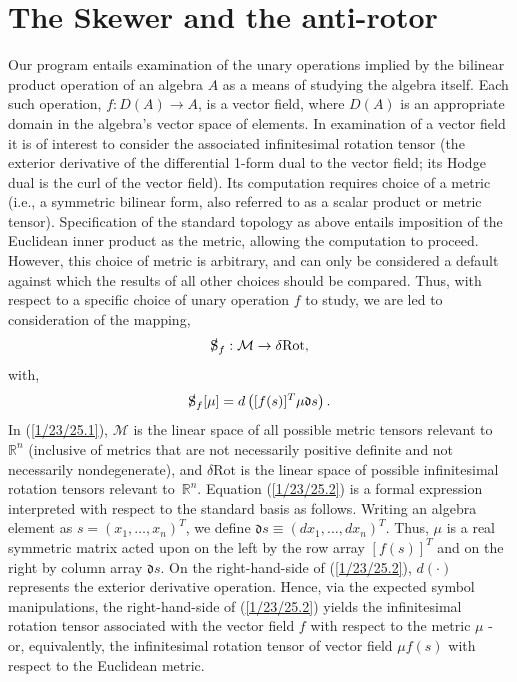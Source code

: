 \documentclass{amsart}
\numberwithin{equation}{section}
\theoremstyle{definition}
\numberwithin{theorem}{section}
\begin{document}
\section{The Skewer and the anti-rotor} 
Our program entails examination of the unary operations implied by the bilinear product operation of an algebra $A$ as a means of studying the algebra itself.
Each such operation, $f:D(A)\rightarrow A$, is a vector field, where $D(A)$ is an appropriate domain in the algebra's vector space of elements.  In examination of a vector field it is of interest to consider the associated infinitesimal rotation tensor (the exterior derivative of the differential 1-form dual to the vector field; its Hodge dual is the curl of the vector field).  Its computation requires choice of a metric (i.e., a symmetric bilinear form, also referred to as a scalar product or metric tensor).  Specification of the standard topology as above entails imposition of the Euclidean inner product as the metric, allowing the computation to proceed.  However, this choice of metric is arbitrary, and can only be considered a default against which the results of all other choices should be compared.  Thus, with respect to a specific choice of unary operation $f$ to study, we are led to consideration of the mapping, \begin{equation}\label{1/23/25.1} \slashed{\text{S}}_f: \mathcal{M} \rightarrow \delta\text{Rot},\end{equation}  
with, \begin{equation}\label{1/23/25.2} \slashed{\text{S}}_f[\mu] = d\left([f(s)]^T \mu \mathfrak{d}s\right).  \end{equation}
 In (\ref{1/23/25.1}), $\mathcal{M}$ is the linear space of all possible metric tensors relevant to $\mathbb{R}^n$ (inclusive of metrics that are not necessarily positive definite and not necessarily nondegenerate), and $\delta\text{Rot}$ is the linear space of possible infinitesimal rotation tensors relevant \mbox{to $\mathbb{R}^n$}.  Equation (\ref{1/23/25.2}) is a formal expression interpreted with respect to the standard basis as follows.  Writing an algebra element as $s=(x_1,\dots,x_n)^T$, we define $\mathfrak{d}s \equiv (dx_1,\dots,dx_n)^T$. Thus, $\mu$ is a real symmetric matrix acted upon on the left by the row array $[f(s)]^T$ and on the right by column array $\mathfrak{d}s$.  On the right-hand-side of (\ref{1/23/25.2}), $d(\cdot)$ represents the exterior derivative operation.  Hence, via the expected symbol manipulations, the right-hand-side of (\ref{1/23/25.2}) yields the infinitesimal rotation tensor associated with the vector field $f$ with respect to the metric $\mu$ - or, equivalently, the infinitesimal rotation tensor of vector field $\mu f(s)$ with respect to the Euclidean metric.
\end{document}
